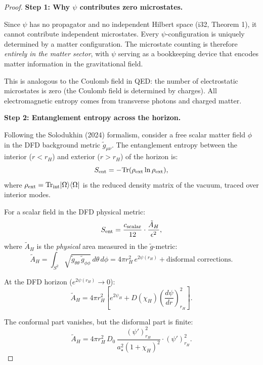 \documentclass[11pt,a4paper]{article}
\begin{document}
\begin{proof}
\textbf{Step 1: Why $\psi$ contributes zero microstates.}

Since $\psi$ has no propagator and no independent Hilbert space (i32, Theorem 1), it cannot contribute independent microstates. Every $\psi$-configuration is uniquely determined by a matter configuration. The microstate counting is therefore \emph{entirely in the matter sector}, with $\psi$ serving as a bookkeeping device that encodes matter information in the gravitational field.

This is analogous to the Coulomb field in QED: the number of electrostatic microstates is zero (the Coulomb field is determined by charges). All electromagnetic entropy comes from transverse photons and charged matter.

\textbf{Step 2: Entanglement entropy across the horizon.}

Following the Solodukhin (2024) formalism, consider a free scalar matter field $\phi$ in the DFD background metric $\tilde{g}_{\mu\nu}$. The entanglement entropy between the interior ($r < r_H$) and exterior ($r > r_H$) of the horizon is:
\begin{equation}
S_{\rm ent} = -\text{Tr}(\rho_{\rm ext}\ln\rho_{\rm ext}),
\end{equation}
where $\rho_{\rm ext} = \text{Tr}_{\rm int}|\Omega\rangle\langle\Omega|$ is the reduced density matrix of the vacuum, traced over interior modes.

For a scalar field in the DFD physical metric:
\begin{equation}
S_{\rm ent} = \frac{c_{\rm scalar}}{12}\cdot\frac{\tilde{A}_H}{\epsilon^2},
\end{equation}
where $\tilde{A}_H$ is the \emph{physical} area measured in the $\tilde{g}$-metric:
\begin{equation}
\tilde{A}_H = \int_{S^2} \sqrt{\tilde{g}_{\theta\theta}\,\tilde{g}_{\phi\phi}}\,d\theta\,d\phi = 4\pi r_H^2\,e^{2\psi(r_H)} + \text{disformal corrections}.
\end{equation}

At the DFD horizon ($e^{2\psi(r_H)} \to 0$):
\begin{equation}
\tilde{A}_H = 4\pi r_H^2\left[e^{2\psi_H} + D(\chi_H)\left(\frac{d\psi}{dr}\right)^2_{r_H}\right].
\end{equation}

The conformal part vanishes, but the disformal part is finite:
\begin{equation}
\tilde{A}_H = 4\pi r_H^2\,D_0\,\frac{(\psi')^2_{r_H}}{a_\star^2(1+\chi_H)^2}\cdot(\psi')^2_{r_H}.
\end{equation}


\end{proof}
\end{document}
